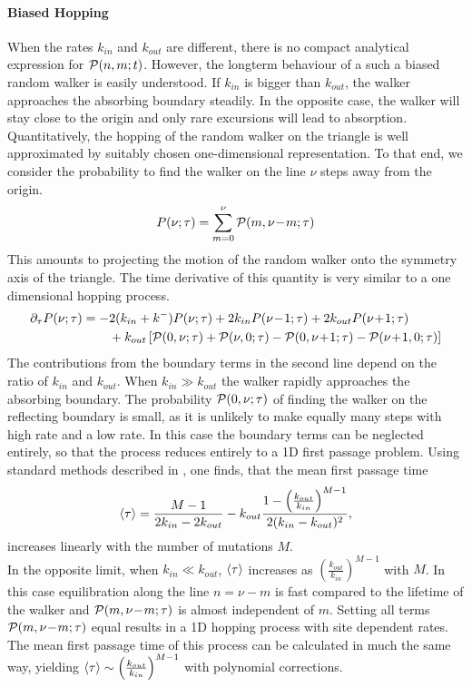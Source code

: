\paragraph{Biased Hopping}
When the rates $k_{in}$ and $k_{out}$ are different, there is no compact analytical expression for ${\cal P}(n,m;t)$. However, the longterm behaviour of a such a biased random walker is easily understood. If $k_{in}$ is bigger than $k_{out}$, the walker approaches the absorbing boundary steadily. In the opposite case, the walker will stay close to the origin and only rare excursions will lead to absorption. Quantitatively, the hopping of the random walker on the triangle is well approximated by suitably chosen one-dimensional representation. To that end, we consider the probability to find the walker on the line $\nu$ steps away from the origin.
\begin{equation}
P(\nu;\tau)=\sum_{m=0}^{\nu}{\cal P}(m,\nu\!-\!m;\tau)
\end{equation}
This amounts to projecting the motion of the random walker onto the symmetry axis of the triangle. 
The time derivative of this quantity is very similar to a one dimensional hopping process.
\begin{equation}
\begin{split}
\partial_\tau P(\nu;\tau)=-&2(k_{in}+k^{-})P(\nu;\tau)+2k_{in}P(\nu\!-\!1;\tau)+2k_{out}P(\nu\!+\!1;\tau)\\
&+k_{out}\left[\PD(0,\nu;\tau)+\PD(\nu,0;\tau)-\PD(0,\nu\!+\!1;\tau)-\PD(\nu\!+\!1,0;\tau)\right]
\end{split}
\end{equation}
The contributions from the boundary terms in the second line depend on the ratio of $k_{in}$ and $k_{out}$. 
When $k_{in}\gg k_{out}$ the walker rapidly approaches the absorbing boundary. The probability ${\cal P}(0,\nu;\tau)$  of finding the walker on the reflecting boundary is small, as it is unlikely to make equally many steps with high rate and a low rate. In this case the boundary terms can be neglected entirely, so that the process reduces entirely to a 1D first passage problem. Using standard methods described in , one finds, that the mean first passage time 
\begin{equation}
\langle \tau \rangle=\frac{M-1}{2k_{in}-2k_{out}}-k_{out}\frac{1-\left(\frac{k_{out}}{k_{in}}\right)^{M-1}}{2(k_{in}-k_{out})^2},
\end{equation}
increases linearly with the number of mutations $M$.  \\
In the opposite limit, when $k_{in}\ll k_{out}$, $\langle \tau \rangle$ increases as $\left(\frac{k_{out}}{k_{in}}\right)^{M-1}$ with $M$. In this case equilibration along the line $n\!=\!\nu\!-\!m$ is fast compared to the lifetime of the walker and  ${\cal P}(m,\nu\!-\!m;\tau)$ is almost independent of  $m$. Setting all terms ${\cal P}(m,\nu\!-\!m;\tau)$ equal results in a 1D hopping process with site dependent rates. The mean first passage time of this process can be calculated in much the same way, yielding $\langle \tau \rangle\sim \left(\frac{k_{out}}{k_{in}}\right)^{M-1}$ with polynomial corrections.
